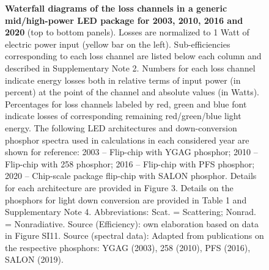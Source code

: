\documentclass[parskip=full]{article}
\begin{document}
\begin{figure}[h!]
 \caption{\textbf{Waterfall diagrams of the loss channels in a generic mid/high-power LED package for 2003, 2010, 2016 and 2020} (top to bottom panels). Losses are normalized to 1 Watt of electric power input (yellow bar on the left). Sub-efficiencies corresponding to each loss channel are listed below each column and described in Supplementary Note 2. Numbers for each loss channel indicate energy losses both in relative terms of input power (in percent) at the point of the channel and absolute values (in Watts). Percentages for loss channels labeled by red, green and blue font indicate losses of corresponding remaining red/green/blue light energy. The following LED architectures and down-conversion phosphor spectra used in calculations in each considered year are shown for reference: 2003 – Flip-chip with YGAG phosphor; 2010 – Flip-chip with 258 phosphor; 2016 – Flip-chip with PFS phosphor; 2020 – Chip-scale package flip-chip with SALON phosphor. Details for each architecture are provided in Figure 3. Details on the phosphors for light down conversion are provided in Table 1 and Supplementary Note 4.  Abbreviations: Scat. = Scattering; Nonrad. = Nonradiative.  Source (Efficiency): own elaboration based on data in Figure SI11. Source (spectral data): Adapted from publications on the respective phosphors: YGAG (2003)\cite{Mueller2002}, 258 (2010)\cite{MuellerMach2005}, PFS (2016)\cite{Murphy2015}, SALON (2019)\cite{Hoerder2019}.}
 \label{fgr:waterfall}
\end{figure}
\end{document}
